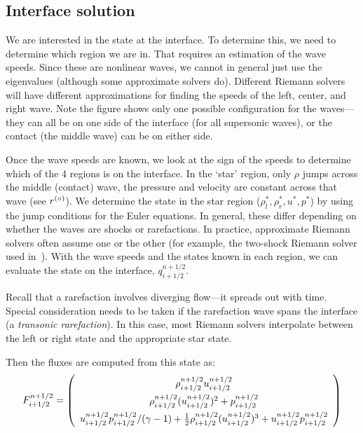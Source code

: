 \subsection{Interface solution}

We are interested in the state at the interface.  To
determine this, we need to determine which region we are in.  That
requires an estimation of the wave speeds.  Since these are nonlinear
waves, we cannot in general just use the eigenvalues (although some
approximate solvers do).  Different Riemann solvers will have
different approximations for finding the speeds of the left, center,
and right wave.  Note the figure shows only one possible configuration
for the waves---they can all be on one side of the interface (for
all supersonic waves), or the contact (the middle wave) can be on either
side.

Once the wave speeds are known, we look at the sign of the speeds to
determine which of the 4 regions is on the interface.  In the `star'
region, only $\rho$ jumps across the middle (contact) wave, the
pressure and velocity are constant across that wave (see $r^{(\circ)}$).
We determine the state in the star region ($\rho_l^*, \rho_r^*, u^*,
p^*$) by using the jump conditions for the Euler equations.  In
general, these differ depending on whether the waves are shocks or
rarefactions.  In practice, approximate Riemann solvers often assume
one or the other (for example, the two-shock Riemann solver used
in~\cite{colellaglaz:1985}).  With the wave speeds and the states
known in each region, we can evaluate the state on the interface,
$q_{i+1/2}^{n+1/2}$.

Recall that a rarefaction involves diverging flow---it spreads out
with time.  Special consideration needs to be taken if the rarefaction
wave spans the interface (a {\em transonic rarefaction}).  In this
case, most Riemann solvers interpolate between the left or right state
and the appropriate star state.

Then the fluxes are computed from this state as:
\begin{equation}
\renewcommand{\arraystretch}{1.5}
F_{i+1/2}^{n+1/2} = \left ( \begin{array}{c}
                             \rho_{i+1/2}^{n+1/2} u_{i+1/2}^{n+1/2} \\
                             \rho_{i+1/2}^{n+1/2} (u_{i+1/2}^{n+1/2})^2 + p_{i+1/2}^{n+1/2} \\
                             u_{i+1/2}^{n+1/2} p_{i+1/2}^{n+1/2} / (\gamma - 1)  +
                             \frac{1}{2} \rho_{i+1/2}^{n+1/2} (u_{i+1/2}^{n+1/2})^3 +
                             u_{i+1/2}^{n+1/2} p_{i+1/2}^{n+1/2}
                            \end{array} \right )
\renewcommand{\arraystretch}{1.0}
\end{equation}

